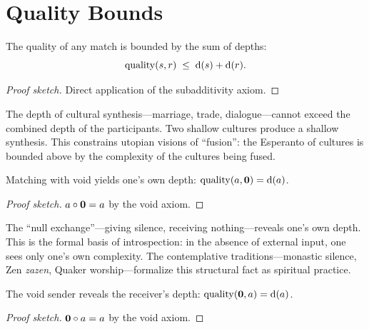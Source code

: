 \section{Quality Bounds}
\label{sec:ch12-quality}

\begin{theorem}
\label{thm:quality-bound}
The quality of any match is bounded by the sum of depths:
\[
  \operatorname{quality}(s, r) \;\le\; \operatorname{d}(s) + \operatorname{d}(r).
\]
\end{theorem}

\begin{proof}[Proof sketch]
Direct application of the subadditivity axiom.
\end{proof}

The depth of cultural synthesis---marriage, trade, dialogue---cannot exceed
the combined depth of the participants.  Two shallow cultures produce a
shallow synthesis.  This constrains utopian visions of ``fusion'': the
Esperanto of cultures is bounded above by the complexity of the cultures
being fused.

\begin{theorem}
\label{thm:void-quality-right}
Matching with void yields one's own depth: $\operatorname{quality}(a, \mathbf{0}) = \operatorname{d}(a)$.
\end{theorem}

\begin{proof}[Proof sketch]
$a \circ \mathbf{0} = a$ by the void axiom.
\end{proof}

The ``null exchange''---giving silence, receiving nothing---reveals one's own
depth.  This is the formal basis of introspection: in the absence of external
input, one sees only one's own complexity.  The contemplative
traditions---monastic silence, Zen \emph{zazen}, Quaker worship---formalize
this structural fact as spiritual practice.

\begin{theorem}
\label{thm:void-quality-left}
The void sender reveals the receiver's depth: $\operatorname{quality}(\mathbf{0}, a) = \operatorname{d}(a)$.
\end{theorem}

\begin{proof}[Proof sketch]
$\mathbf{0} \circ a = a$ by the void axiom.
\end{proof}

